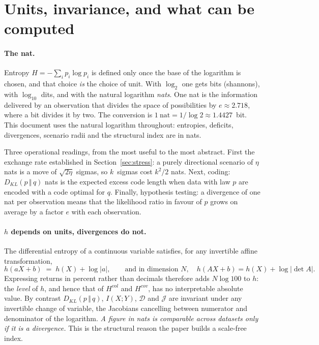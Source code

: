 \documentclass[11pt]{article}
\theoremstyle{definition}
\theoremstyle{remark}
\newcommand{\JJ}{\mathcal{J}}
\newcommand{\DD}{\mathcal{D}}
\newcommand{\KL}[2]{D_{KL}\!\left(#1\,\Vert\,#2\right)}
\begin{document}
\section{Units, invariance, and what can be computed}
\label{app:units}

\paragraph{The nat.} Entropy $H=-\sum_i p_i\log p_i$ is defined only once the
base of the logarithm is chosen, and that choice \emph{is} the choice of unit.
With $\log_2$ one gets bits (shannons), with $\log_{10}$ dits, and with the
natural logarithm \emph{nats}. One nat is the information delivered by an
observation that divides the space of possibilities by $e\approx2.718$, where a
bit divides it by two. The conversion is $1~\text{nat}=1/\log 2\approx1.4427$~bit.
This document uses the natural logarithm throughout: entropies, deficits,
divergences, scenario radii and the structural index are in nats.

Three operational readings, from the most useful to the most abstract. First the
exchange rate established in Section~\ref{sec:stress}: a purely directional
scenario of $\eta$ nats is a move of $\sqrt{2\eta}$ sigmas, so $k$~sigmas cost
$k^2/2$ nats. Next, coding: $\KL{p}{q}$ nats is the expected excess code length
when data with law $p$ are encoded with a code optimal for $q$. Finally,
hypothesis testing: a divergence of one nat per observation means that the
likelihood ratio in favour of $p$ grows on average by a factor $e$ with each
observation.

\paragraph{$h$ depends on units, divergences do not.} The differential entropy
of a continuous variable satisfies, for any invertible affine transformation,
\begin{equation}
\label{eq:h-scaling}
h(aX+b) \;=\; h(X) + \log|a| ,
\qquad\text{and in dimension } N,\quad h(AX+b)=h(X)+\log|\det A| .
\end{equation}
Expressing returns in percent rather than decimals therefore adds $N\log 100$ to
$h$: the \emph{level} of $h$, and hence that of $H^{vol}$ and $H^{cov}$, has no
interpretable absolute value. By contrast $\KL{p}{q}$, $I(X;Y)$, $\DD$ and $\JJ$
are invariant under any invertible change of variable, the Jacobians cancelling
between numerator and denominator of the logarithm. \emph{A figure in nats is
comparable across datasets only if it is a divergence.} This is the structural
reason the paper builds a scale-free index.
\end{document}

